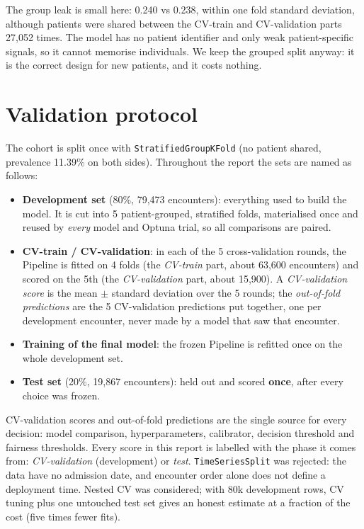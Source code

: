 \documentclass[11pt,a4paper]{article}
\newcommand{\code}[1]{\texttt{\small #1}}
\begin{document}
The group leak is small here: 0.240 vs 0.238, within one fold standard deviation, although patients were shared between the CV-train and CV-validation parts 27{,}052 times. The model has no patient identifier and only weak patient-specific signals, so it cannot memorise individuals. We keep the grouped split anyway: it is the correct design for new patients, and it costs nothing.

\section{Validation protocol}
\label{sec:protocol}

The cohort is split once with \code{StratifiedGroupKFold} (no patient shared, prevalence 11.39\% on both sides). Throughout the report the sets are named as follows:
\begin{itemize}
\item \textbf{Development set} (80\%, 79{,}473 encounters): everything used to build the model. It is cut into 5 patient-grouped, stratified folds, materialised once and reused by \emph{every} model and Optuna trial, so all comparisons are paired.
\item \textbf{CV-train / CV-validation}: in each of the 5 cross-validation rounds, the Pipeline is fitted on 4 folds (the \emph{CV-train} part, about 63{,}600 encounters) and scored on the 5th (the \emph{CV-validation} part, about 15{,}900). A \emph{CV-validation score} is the mean $\pm$ standard deviation over the 5 rounds; the \emph{out-of-fold predictions} are the 5 CV-validation predictions put together, one per development encounter, never made by a model that saw that encounter.
\item \textbf{Training of the final model}: the frozen Pipeline is refitted once on the whole development set.
\item \textbf{Test set} (20\%, 19{,}867 encounters): held out and scored \textbf{once}, after every choice was frozen.
\end{itemize}
CV-validation scores and out-of-fold predictions are the single source for every decision: model comparison, hyperparameters, calibrator, decision threshold and fairness thresholds. Every score in this report is labelled with the phase it comes from: \emph{CV-validation} (development) or \emph{test}.
\code{TimeSeriesSplit} was rejected: the data have no admission date, and encounter order alone does not define a deployment time. Nested CV was considered; with 80k development rows, CV tuning plus one untouched test set gives an honest estimate at a fraction of the cost (five times fewer fits).
\end{document}
